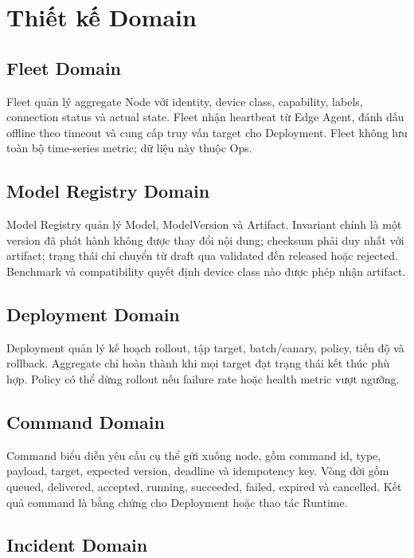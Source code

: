 \section{Thiết kế Domain}

\subsection{Fleet Domain}

Fleet quản lý aggregate Node với identity, device class, capability, labels,
connection status và actual state. Fleet nhận heartbeat từ Edge Agent, đánh dấu
offline theo timeout và cung cấp truy vấn target cho Deployment. Fleet không lưu
toàn bộ time-series metric; dữ liệu này thuộc Ops.

\subsection{Model Registry Domain}

Model Registry quản lý Model, ModelVersion và Artifact. Invariant chính là một
version đã phát hành không được thay đổi nội dung; checksum phải duy nhất với
artifact; trạng thái chỉ chuyển từ draft qua validated đến released hoặc rejected.
Benchmark và compatibility quyết định device class nào được phép nhận artifact.

\subsection{Deployment Domain}

Deployment quản lý kế hoạch rollout, tập target, batch/canary, policy, tiến độ và
rollback. Aggregate chỉ hoàn thành khi mọi target đạt trạng thái kết thúc phù hợp.
Policy có thể dừng rollout nếu failure rate hoặc health metric vượt ngưỡng.

\subsection{Command Domain}

Command biểu diễn yêu cầu cụ thể gửi xuống node, gồm command id, type, payload,
target, expected version, deadline và idempotency key. Vòng đời gồm queued,
delivered, accepted, running, succeeded, failed, expired và cancelled. Kết quả
command là bằng chứng cho Deployment hoặc thao tác Runtime.

\subsection{Incident Domain}

